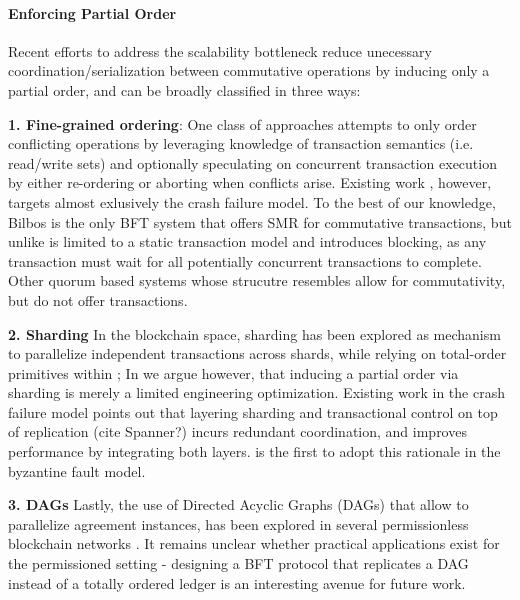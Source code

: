 \paragraph{Enforcing Partial Order}
Recent efforts to address the scalability bottleneck reduce unecessary coordination/serialization between commutative operations by inducing only a partial order, and can be broadly classified in three ways:

\textbf{1. Fine-grained ordering}: One class of approaches attempts to only order conflicting operations by leveraging knowledge of transaction semantics (i.e. read/write sets) and optionally speculating on concurrent transaction execution by either re-ordering or aborting when conflicts arise. Existing work \cite{moraru2013there, lamport2005generalized, sutra2011fast, li2012redblue, park2019exploiting, yan2018carousel, mu2016consolidating, mu2014extracting, zhang2015tapir, kraska2013mdcc}, however, targets almost exlusively the crash failure model. To the best of our knowledge, Bilbos \cite{bazzi2018clairvoyant} is the only BFT system that offers SMR for commutative transactions, but unlike \sys is limited to a static transaction model and introduces blocking, as any transaction must wait for all potentially concurrent transactions to complete. Other quorum based systems whose strucutre \sys resembles \cite{malkhi1998byzantine, abd2005fault, cowling2006hq, liskov2006tolerating} allow for commutativity, but do not offer transactions. 

\textbf{2. Sharding} In the blockchain space, sharding has been explored as mechanism to parallelize independent transactions across shards, while relying on total-order primitives within \cite{zamani2018rapidchain, al2017chainspace, kokoris2018omniledger}; In \sys we argue however, that inducing a partial order via sharding is merely a limited engineering optimization. Existing work in the crash failure model \cite{zhang2016operation, zhang2015tapir, mu2016consolidating } points out that layering sharding and transactional control on top of replication (cite Spanner?) incurs redundant coordination, and improves performance by integrating both layers. \sys is the first to adopt this rationale in the byzantine fault model.

\textbf{3. DAGs} Lastly, the use of Directed Acyclic Graphs (DAGs) that allow to parallelize agreement instances, has been explored in several permissionless blockchain networks \cite{pervez2018comparative, popov2016tangle, rocket2018snowflake}. It remains unclear whether practical applications exist for the permissioned setting - designing a BFT protocol that replicates a DAG instead of a totally ordered ledger is an interesting avenue for future work.


